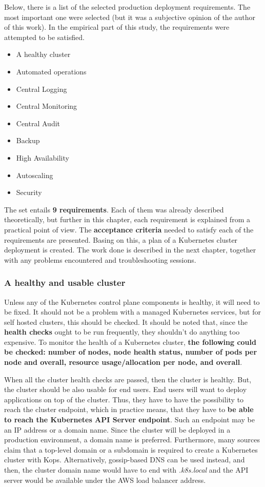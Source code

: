 Below, there is a list of the selected production deployment requirements. The most important one were selected (but it was a subjective opinion of the author of this work). In the empirical part of this study, the requirements were  attempted to be satisfied.
\begin{itemize}
\item A healthy cluster
\item Automated operations
\item Central Logging
\item Central Monitoring
\item Central Audit
\item Backup
\item High Availability
\item Autoscaling
\item Security
\end{itemize}

The set entails \textbf{9 requirements}. Each of them was already described theoretically, but further in this chapter, each requirement is explained from a practical point of view. The \textbf{acceptance criteria} needed to satisfy each of the requirements are presented. Basing on this, a plan of a Kubernetes cluster deployment is created. The work done is described in the next chapter, together with any problems encountered and troubleshooting sessions.

\subsubsection{A healthy and usable cluster}
\label{A healthy cluster}

Unless any of the Kubernetes control plane components is healthy, it will need to be fixed. It should not be a problem with a managed Kubernetes services, but for self hosted clusters, this should be checked. It should be noted that, since the \textbf{health checks} ought to be run frequently, they shouldn't do anything too expensive. To monitor the health of a Kubernetes cluster, \textbf{the following could be checked: number of nodes, node health status, number of pods per node and overall, resource usage/allocation per node, and overall}\cite{book-cndwk}.

When all the cluster health checks are passed, then the cluster is healthy. But, the cluster should be also usable for end users. End users will want to deploy applications on top of the cluster. Thus, they have to have the possibility to reach the cluster endpoint, which in practice means, that they have to \textbf{be able to reach the Kubernetes API Server endpoint}. Such an endpoint may be an IP address or a domain name. Since the cluster will be deployed in a production environment, a domain name is preferred. Furthermore, many sources claim that a top-level domain or a subdomain is required to create a Kubernetes cluster with Kops. Alternatively, gossip-based DNS can be used instead, and then, the cluster domain name would have to end with \textit{.k8s.local} and the API server would be available under the AWS load balancer address\cite{kops-howto-aws}\cite{online-kops-aws}\cite{kops-howto-k8s}\cite{kops-gossip}.

